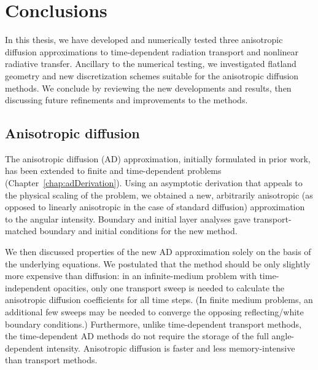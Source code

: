 

\chapter{Conclusions}\label{chap:conclusion}

In this thesis, we have developed and numerically tested three anisotropic
diffusion approximations to time-dependent radiation transport and
nonlinear radiative transfer. Ancillary to the numerical testing, we
investigated flatland geometry and new discretization schemes suitable for the
anisotropic diffusion methods. We conclude by reviewing the new developments and
results, then discussing future refinements and improvements to the methods.

\section{Anisotropic diffusion}

The anisotropic diffusion (AD) approximation, initially formulated in prior work, has been extended to finite and time-dependent problems
(Chapter~\ref{chap:adDerivation}). Using an asymptotic
derivation that appeals to the physical scaling of the problem, we
obtained a new, arbitrarily anisotropic (as opposed to linearly anisotropic in
the case of standard diffusion) approximation to the angular intensity.
Boundary and initial layer analyses gave transport-matched boundary and initial
conditions for the new method.

We then discussed properties of the new AD approximation solely on the basis of
the underlying equations. We postulated that the method should be only slightly
more expensive than diffusion: in an infinite-medium problem with
time-independent opacities, only one transport sweep is needed to calculate
the anisotropic diffusion coefficients for all time steps. (In finite medium
problems, an additional few sweeps may be needed to converge the opposing
reflecting/white boundary conditions.) Furthermore, unlike time-dependent
transport methods, the time-dependent AD methods do not require the storage of
the full angle-dependent intensity. Anisotropic diffusion is faster and less
memory-intensive than transport methods.

